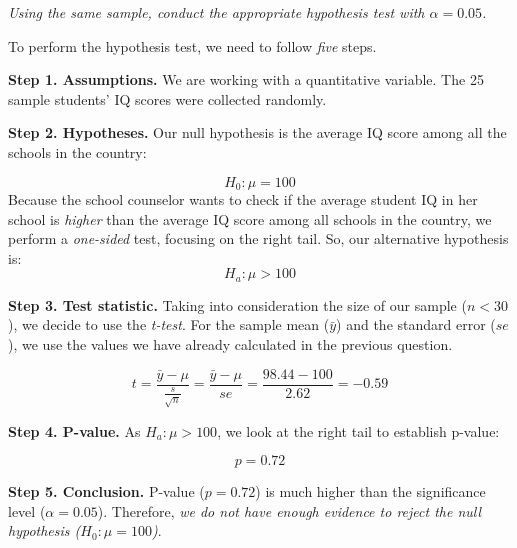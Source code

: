 \documentclass[12pt,letterpaper]{article}
\begin{document}
\begin{enumerate}
		\textit{Using the same sample, conduct the appropriate hypothesis test with $\alpha=0.05$.}
		
		\vspace{1cm}
		
		To perform the hypothesis test, we need to follow \textit{five} steps.
		
		\vspace{.5cm}
		
		\textbf{Step 1. Assumptions.} We are working with a quantitative variable. The 25 sample students' IQ scores were collected randomly.
		
		\vspace{.5cm}
		
		\textbf{Step 2. Hypotheses.} Our null hypothesis is the average IQ score among all the schools in the country:
		
		$$H_0: \mu = 100$$
		Because the school counselor wants to check if the average student IQ in her school is \textit{higher} than the average IQ score among all schools in the country, we perform a \textit{one-sided} test, focusing on the right tail. So, our alternative hypothesis is: $$H_a: \mu > 100$$
		
		\vspace{.5cm}
		
		\textbf{Step 3. Test statistic.} Taking into consideration the size of our sample ($n < 30$), we decide to use the \textit{t-test}. For the sample mean ($\bar{y}$) and the standard error ($se$), we use the values we have already calculated in the previous question.
		
		$$t = \frac{\bar{y} - \mu}{\frac{s}{\sqrt{n}}} = \frac{\bar{y} - \mu}{se} = \frac{98.44 - 100}{2.62} = -0.59$$
		
		\vspace{.5cm}
		
		\textbf{Step 4. P-value.} As $H_a: \mu > 100$, we look at the right tail to establish p-value:
		
		$$p = 0.72$$
		
		\vspace{.5cm}
				
		\textbf{Step 5. Conclusion.} P-value ($p=0.72$) is much higher than the significance level ($\alpha=0.05$). Therefore, \textit{we do not have enough evidence to reject the null hypothesis ($H_0: \mu = 100$)}.
				
	\end{enumerate}
	
\end{document}

